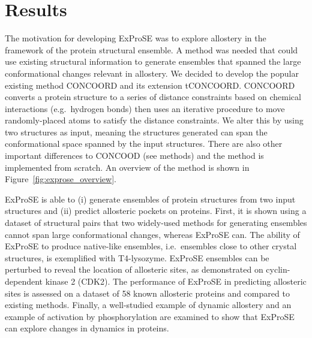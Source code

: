 \section{Results}
\label{sec:exprose_results}

The motivation for developing ExProSE was to explore allostery in the framework of the protein structural ensemble.
A method was needed that could use existing structural information to generate ensembles that spanned the large conformational changes relevant in allostery.
We decided to develop the popular existing method CONCOORD and its extension tCONCOORD.
CONCOORD converts a protein structure to a series of distance constraints based on chemical interactions (e.g.\ hydrogen bonds) then uses an iterative procedure to move randomly-placed atoms to satisfy the distance constraints.
We alter this by using two structures as input, meaning the structures generated can span the conformational space spanned by the input structures.
There are also other important differences to CONCOOD (see methods) and the method is implemented from scratch.
An overview of the method is shown in Figure~\ref{fig:exprose_overview}.

ExProSE is able to (i) generate ensembles of protein structures from two input structures and (ii) predict allosteric pockets on proteins.
First, it is shown using a dataset of structural pairs that two widely-used methods for generating ensembles cannot span large conformational changes, whereas ExProSE can.
The ability of ExProSE to produce native-like ensembles, i.e.\ ensembles close to other crystal structures, is exemplified with T4-lysozyme.
ExProSE ensembles can be perturbed to reveal the location of allosteric sites, as demonstrated on cyclin-dependent kinase 2 (CDK2).
The performance of ExProSE in predicting allosteric sites is assessed on a dataset of 58 known allosteric proteins and compared to existing methods.
Finally, a well-studied example of dynamic allostery and an example of activation by phosphorylation are examined to show that ExProSE can explore changes in dynamics in proteins.


